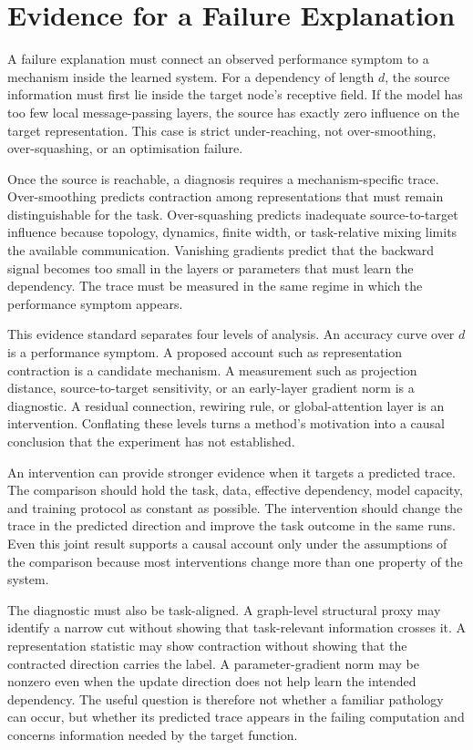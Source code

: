 \section{Evidence for a Failure Explanation}

A failure explanation must connect an observed performance symptom to a mechanism inside the learned system.
For a dependency of length $d$, the source information must first lie inside the target node's receptive field.
If the model has too few local message-passing layers, the source has exactly zero influence on the target representation.
This case is strict under-reaching, not over-smoothing, over-squashing, or an optimisation failure.

Once the source is reachable, a diagnosis requires a mechanism-specific trace.
Over-smoothing predicts contraction among representations that must remain distinguishable for the task.
Over-squashing predicts inadequate source-to-target influence because topology, dynamics, finite width, or task-relative mixing limits the available communication.
Vanishing gradients predict that the backward signal becomes too small in the layers or parameters that must learn the dependency.
The trace must be measured in the same regime in which the performance symptom appears.

This evidence standard separates four levels of analysis.
An accuracy curve over $d$ is a performance symptom.
A proposed account such as representation contraction is a candidate mechanism.
A measurement such as projection distance, source-to-target sensitivity, or an early-layer gradient norm is a diagnostic.
A residual connection, rewiring rule, or global-attention layer is an intervention.
Conflating these levels turns a method's motivation into a causal conclusion that the experiment has not established.

An intervention can provide stronger evidence when it targets a predicted trace.
The comparison should hold the task, data, effective dependency, model capacity, and training protocol as constant as possible.
The intervention should change the trace in the predicted direction and improve the task outcome in the same runs.
Even this joint result supports a causal account only under the assumptions of the comparison because most interventions change more than one property of the system.

The diagnostic must also be task-aligned.
A graph-level structural proxy may identify a narrow cut without showing that task-relevant information crosses it.
A representation statistic may show contraction without showing that the contracted direction carries the label.
A parameter-gradient norm may be nonzero even when the update direction does not help learn the intended dependency.
The useful question is therefore not whether a familiar pathology can occur, but whether its predicted trace appears in the failing computation and concerns information needed by the target function.

